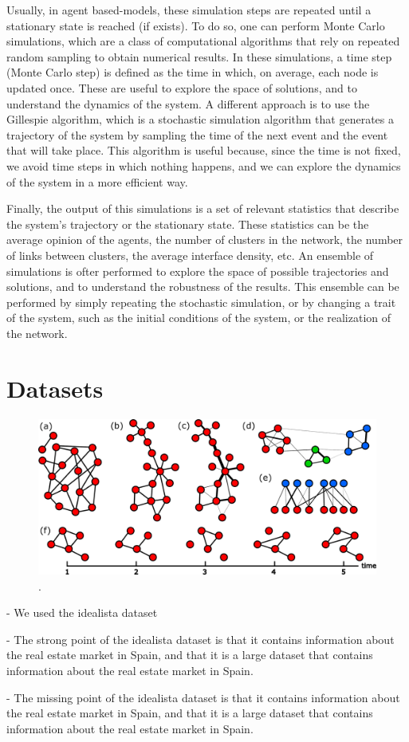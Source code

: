 Usually, in agent based-models, these simulation steps are repeated until a stationary state is reached (if exists). To do so, one can perform Monte Carlo simulations, which are a class of computational algorithms that rely on repeated random sampling to obtain numerical results. In these simulations, a time step (Monte Carlo step) is defined as the time in which, on average, each node is updated once. These are useful to explore the space of solutions, and to understand the dynamics of the system. A different approach is to use the Gillespie algorithm, which is a stochastic simulation algorithm that generates a trajectory of the system by sampling the time of the next event and the event that will take place. This algorithm is useful because, since the time is not fixed, we avoid time steps in which nothing happens, and we can explore the dynamics of the system in a more efficient way.

Finally, the output of this simulations is a set of relevant statistics that describe the system's trajectory or the stationary state. These statistics can be the average opinion of the agents, the number of clusters in the network, the number of links between clusters, the average interface density, etc. An ensemble of simulations is ofter performed to explore the space of possible trajectories and solutions, and to understand the robustness of the results. This ensemble can be performed by simply repeating the stochastic simulation, or by changing a trait of the system, such as the initial conditions of the system, or the realization of the network.

\section{\label{sec:Datasets} Datasets}

\begin{figure}
    \centering
    \captionsetup{font=sf}
    \includegraphics[width=\textwidth]{Figs/Introduction/network_plot.pdf}
    \caption[Amount of adds per cell]{.}
    \label{fig:netwotk_types}
\end{figure}

- We used the idealista dataset

- The strong point of the idealista dataset is that it contains information about the real estate market in Spain, and that it is a large dataset that contains information about the real estate market in Spain.

- The missing point of the idealista dataset is that it contains information about the real estate market in Spain, and that it is a large dataset that contains information about the real estate market in Spain.
